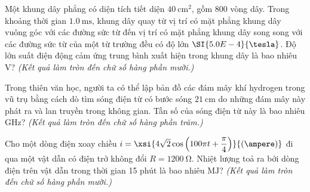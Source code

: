 \begin{ex}
	Một khung dây phẳng có diện tích tiết diện $\SI{40}{\centi\meter^2}$, gồm 800 vòng dây. Trong khoảng thời gian $\SI{1.0}{\milli\second}$, khung dây quay từ vị trí có mặt phẳng khung dây vuông góc với các đường sức từ đến vị trí có mặt phẳng khung dây song song với các đường sức từ của một từ trường đều có độ lớn $\SI{5.0E-4}{\tesla}$. Độ lớn suất điện động cảm ứng trung bình xuất hiện trong khung dây là bao nhiêu $\si{\volt}$? \textit{(Kết quả làm tròn đến chữ số hàng phần mười.)}
	\loigiai{
		
	}
\end{ex}
\begin{ex}
	Trong thiên văn học, người ta có thể lập bản đồ các đám mây khí hydrogen trong vũ trụ bằng cách dò tìm sóng điện từ có bước sóng $\SI{21}{\centi\meter}$ do những đám mây này phát ra và lan truyền trong không gian. Tần số của sóng điện từ này là bao nhiêu $\si{\giga\hertz}$? \textit{(Kết quả làm tròn đến chữ số hàng phần trăm.)}
	\loigiai{
		
	}
\end{ex}
\begin{ex}
	Cho một dòng điện xoay chiều $i=\xsi{4 \sqrt{2} \cos \left(100 \pi t+\dfrac{\pi}{4}\right)}{\left(\ampere\right)}$ đi qua một vật dẫn có điện trở không đổi $R=\SI{1200}{\ohm}$. Nhiệt lượng toả ra bởi dòng điện trên vật dẫn trong thời gian 15 phút là bao nhiêu $\si{\mega\joule}$? \textit{(Kết quả làm tròn đến chữ số hàng phần mười.)}
	\loigiai{
		
	}
\end{ex}
